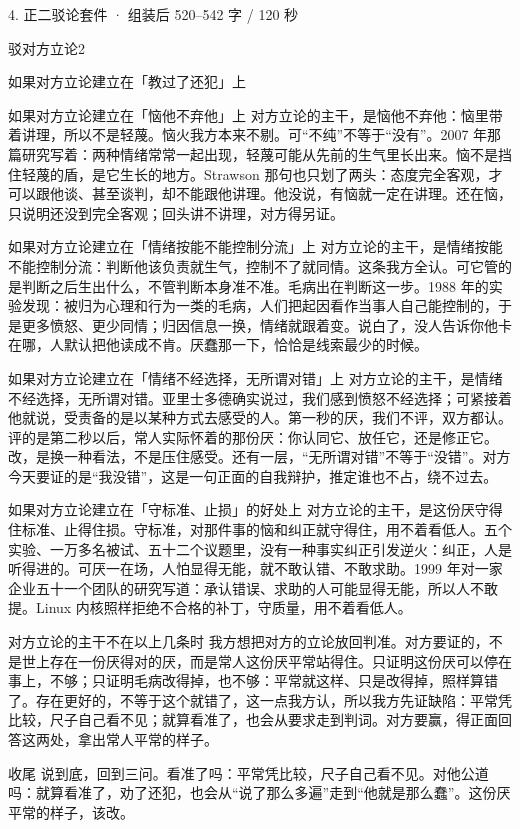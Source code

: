 \documentclass[script,pro]{debate}
\begin{document}
\begin{kit}{4. 正二驳论}{套件 · 组装后 520–542 字 / 120 秒}
\begin{pick}{驳对方立论}{2}
\begin{module}{如果对方立论建立在「教过了还犯」上}
\end{module}
\begin{module}{如果对方立论建立在「恼他不弃他」上}
对方立论的主干，是恼他不弃他：恼里带着讲理，所以不是轻蔑。恼火我方本来不剔。可“不纯”不等于“没有”。2007 年那篇研究写着：两种情绪常常一起出现，轻蔑可能从先前的生气里长出来。恼不是挡住轻蔑的盾，是它生长的地方。Strawson 那句也只划了两头：态度完全客观，才可以跟他谈、甚至谈判，却不能跟他讲理。他没说，有恼就一定在讲理。还在恼，只说明还没到完全客观；回头讲不讲理，对方得另证。
\end{module}
\begin{module}{如果对方立论建立在「情绪按能不能控制分流」上}
对方立论的主干，是情绪按能不能控制分流：判断他该负责就生气，控制不了就同情。这条我方全认。可它管的是判断之后生出什么，不管判断本身准不准。毛病出在判断这一步。1988 年的实验发现：被归为心理和行为一类的毛病，人们把起因看作当事人自己能控制的，于是更多愤怒、更少同情；归因信息一换，情绪就跟着变。说白了，没人告诉你他卡在哪，人默认把他读成不肯。厌蠢那一下，恰恰是线索最少的时候。
\end{module}
\begin{module}{如果对方立论建立在「情绪不经选择，无所谓对错」上}
对方立论的主干，是情绪不经选择，无所谓对错。亚里士多德确实说过，我们感到愤怒不经选择；可紧接着他就说，受责备的是以某种方式去感受的人。第一秒的厌，我们不评，双方都认。评的是第二秒以后，常人实际怀着的那份厌：你认同它、放任它，还是修正它。改，是换一种看法，不是压住感受。还有一层，“无所谓对错”不等于“没错”。对方今天要证的是“我没错”，这是一句正面的自我辩护，推定谁也不占，绕不过去。
\end{module}
\begin{module}{如果对方立论建立在「守标准、止损」的好处上}
对方立论的主干，是这份厌守得住标准、止得住损。守标准，对那件事的恼和纠正就守得住，用不着看低人。五个实验、一万多名被试、五十二个议题里，没有一种事实纠正引发逆火：纠正，人是听得进的。可厌一在场，人怕显得无能，就不敢认错、不敢求助。1999 年对一家企业五十一个团队的研究写道：承认错误、求助的人可能显得无能，所以人不敢提。Linux 内核照样拒绝不合格的补丁，守质量，用不着看低人。
\end{module}
\begin{fallback}{对方立论的主干不在以上几条时}
我方想把对方的立论放回判准。对方要证的，不是世上存在一份厌得对的厌，而是常人这份厌平常站得住。只证明这份厌可以停在事上，不够；只证明毛病改得掉，也不够：平常就这样、只是改得掉，照样算错了。存在更好的，不等于这个就错了，这一点我方认，所以我方先证缺陷：平常凭比较，尺子自己看不见；就算看准了，也会从要求走到判词。对方要赢，得正面回答这两处，拿出常人平常的样子。
\end{fallback}
\end{pick}
\begin{fixed}{收尾}
说到底，回到三问。看准了吗：平常凭比较，尺子自己看不见。对他公道吗：就算看准了，劝了还犯，也会从“说了那么多遍”走到“他就是那么蠢”。这份厌平常的样子，该改。
\end{fixed}
\end{kit}
\end{document}
